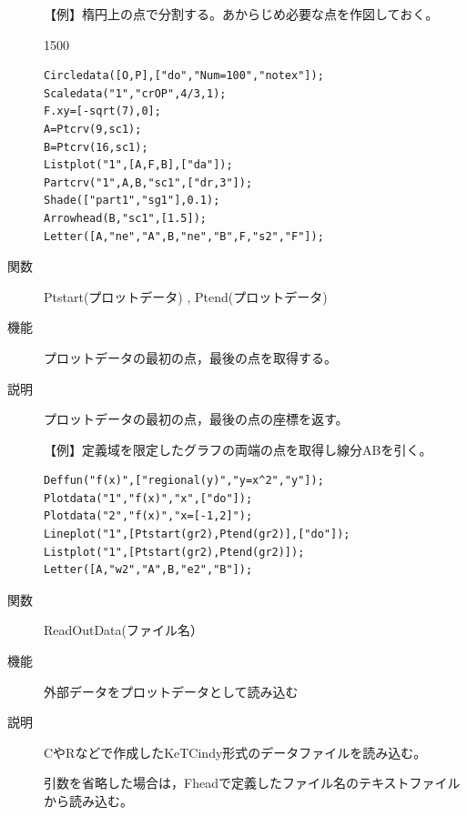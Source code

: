 \documentclass[papersize,a4paper,12pt,uplatex]{jsarticle}
\begin{document}
\begin{description}
\vspace{\baselineskip}
【例】楕円上の点で分割する。あからじめ必要な点を作図しておく。

\begin{layer}{150}{0}
\end{layer}
\begin{verbatim}
Circledata([O,P],["do","Num=100","notex"]);
Scaledata("1","crOP",4/3,1);
F.xy=[-sqrt(7),0];
A=Ptcrv(9,sc1);
B=Ptcrv(16,sc1);
Listplot("1",[A,F,B],["da"]);
Partcrv("1",A,B,"sc1",["dr,3"]);
Shade(["part1","sg1"],0.1);
Arrowhead(B,"sc1",[1.5]);
Letter([A,"ne","A",B,"ne","B",F,"s2","F"]);
\end{verbatim}
 

\vspace{\baselineskip}
\hypertarget{ptstart}{}
\item[関数]Ptstart(プロットデータ) , Ptend(プロットデータ)
\item[機能]プロットデータの最初の点，最後の点を取得する。
\item[説明]プロットデータの最初の点，最後の点の座標を返す。

\vspace{\baselineskip}
【例】定義域を限定したグラフの両端の点を取得し線分ABを引く。
\begin{verbatim}
Deffun("f(x)",["regional(y)","y=x^2","y"]); 
Plotdata("1","f(x)","x",["do"]);
Plotdata("2","f(x)","x=[-1,2]");
Lineplot("1",[Ptstart(gr2),Ptend(gr2)],["do"]);
Listplot("1",[Ptstart(gr2),Ptend(gr2)]);
Letter([A,"w2","A",B,"e2","B"]);
\end{verbatim}
\vspace{\baselineskip}
\begin{center}  \end{center}

\vspace{\baselineskip}
\hypertarget{readoutdata}{}
\item[関数]ReadOutData(ファイル名）
\item[機能]外部データをプロットデータとして読み込む
\item[説明]CやRなどで作成したKeTCindy形式のデータファイルを読み込む。

引数を省略した場合は，Fheadで定義したファイル名のテキストファイルから読み込む。


\end{description}
\end{document}
